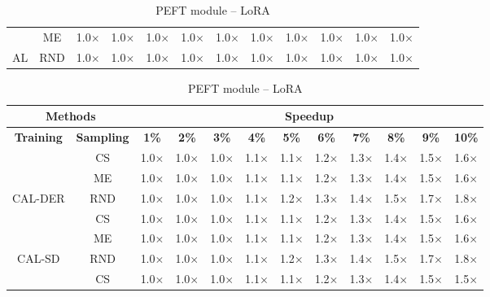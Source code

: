 \begin{table}[htbp]
\begin{subtable}{\linewidth}
\begin{tabular}{c|c|cccccccccc}
 & ME & 1.0$\times$ & 1.0$\times$ & 1.0$\times$ & 1.0$\times$ & 1.0$\times$ & 1.0$\times$ & 1.0$\times$ & 1.0$\times$ & 1.0$\times$ & 1.0$\times$\\

\multirow{-3}{*}{\raggedright\arraybackslash AL} & RND & 1.0$\times$ & 1.0$\times$ & 1.0$\times$ & 1.0$\times$ & 1.0$\times$ & 1.0$\times$ & 1.0$\times$ & 1.0$\times$ & 1.0$\times$ & 1.0$\times$\\
\bottomrule
\end{tabular}
\end{subtable}
\vspace{1em}
\begin{subtable}{\linewidth}
\centering
\caption{PEFT module -- LoRA}

\begin{tabular}{c|c|cccccccccc}
\toprule
\multicolumn{2}{c|}{\textbf{Methods}} & \multicolumn{10}{c}{\textbf{Speedup}} \\
\midrule
\textbf{Training} & \textbf{Sampling} & \textbf{1\%} & \textbf{2\%} & \textbf{3\%} & \textbf{4\%} & \textbf{5\%} & \textbf{6\%} & \textbf{7\%} & \textbf{8\%} & \textbf{9\%} & \textbf{10\%}\\
\midrule
 & CS & 1.0$\times$ & 1.0$\times$ & 1.0$\times$ & 1.1$\times$ & 1.1$\times$ & 1.2$\times$ & 1.3$\times$ & 1.4$\times$ & 1.5$\times$ & 1.6$\times$\\

 & ME & 1.0$\times$ & 1.0$\times$ & 1.0$\times$ & 1.1$\times$ & 1.1$\times$ & 1.2$\times$ & 1.3$\times$ & 1.4$\times$ & 1.5$\times$ & 1.6$\times$\\

\multirow{-3}{*}{\raggedright\arraybackslash CAL-DER} & RND & 1.0$\times$ & 1.0$\times$ & 1.0$\times$ & 1.1$\times$ & 1.2$\times$ & 1.3$\times$ & 1.4$\times$ & 1.5$\times$ & 1.7$\times$ & 1.8$\times$\\
\midrule
 & CS & 1.0$\times$ & 1.0$\times$ & 1.0$\times$ & 1.1$\times$ & 1.1$\times$ & 1.2$\times$ & 1.3$\times$ & 1.4$\times$ & 1.5$\times$ & 1.6$\times$\\

 & ME & 1.0$\times$ & 1.0$\times$ & 1.0$\times$ & 1.1$\times$ & 1.1$\times$ & 1.2$\times$ & 1.3$\times$ & 1.4$\times$ & 1.5$\times$ & 1.6$\times$\\

\multirow{-3}{*}{\raggedright\arraybackslash CAL-SD} & RND & 1.0$\times$ & 1.0$\times$ & 1.0$\times$ & 1.1$\times$ & 1.2$\times$ & 1.3$\times$ & 1.4$\times$ & 1.5$\times$ & 1.7$\times$ & 1.8$\times$\\
\midrule
 & CS & 1.0$\times$ & 1.0$\times$ & 1.0$\times$ & 1.1$\times$ & 1.1$\times$ & 1.2$\times$ & 1.3$\times$ & 1.4$\times$ & 1.5$\times$ & 1.5$\times$\\


\end{tabular}
\end{subtable}
\end{table}

